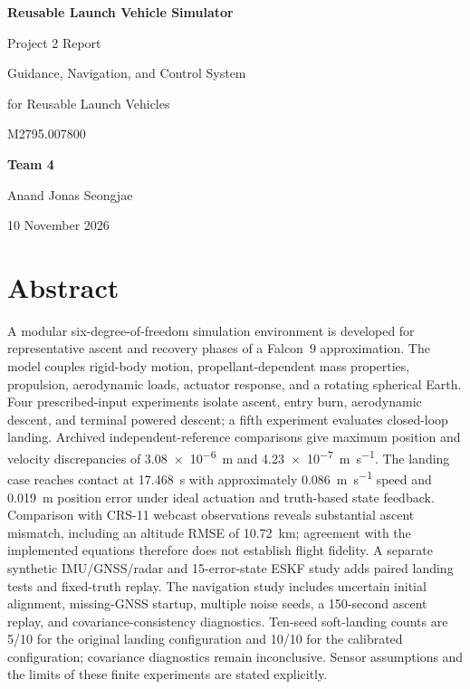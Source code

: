 \documentclass[11pt,letterpaper]{article}
\makeatletter
\newcommand{\compactcontents}{%
  \begingroup\small
  \renewcommand{\l@section}[2]{\addvspace{2pt}%
    \@dottedtocline{1}{0pt}{1.5em}{\bfseries ##1}{\bfseries ##2}}%
  \tableofcontents\endgroup}
\makeatother
\begin{document}
\hypersetup{pageanchor=false}
\begin{titlepage}
\centering
\vspace*{1.5in}
{\LARGE\bfseries Reusable Launch Vehicle Simulator\par}
\vspace{0.2in}
{\Large Project 2 Report\par}
\vspace{0.5in}
{\large Guidance, Navigation, and Control System\par
for Reusable Launch Vehicles\par}
\vspace{0.15in}
{\large M2795.007800\par}
\vfill
{\large\textbf{Team 4}\par}
\vspace{0.15in}
{\large Anand \quad Jonas \quad Seongjae\par}
\vspace{0.35in}
{\large 10 November 2026\par}
\vfill
\end{titlepage}

\hypersetup{pageanchor=true}
\section*{Abstract}
A modular six-degree-of-freedom simulation environment is developed for representative ascent and recovery phases of a Falcon~9 approximation. The model couples rigid-body motion, propellant-dependent mass properties, propulsion, aerodynamic loads, actuator response, and a rotating spherical Earth. Four prescribed-input experiments isolate ascent, entry burn, aerodynamic descent, and terminal powered descent; a fifth experiment evaluates closed-loop landing. Archived independent-reference comparisons give maximum position and velocity discrepancies of \SI{3.08e-6}{\metre} and \SI{4.23e-7}{\metre\per\second}. The landing case reaches contact at \SI{17.468}{\second} with approximately \SI{0.086}{\metre\per\second} speed and \SI{0.019}{\metre} position error under ideal actuation and truth-based state feedback. Comparison with CRS-11 webcast observations reveals substantial ascent mismatch, including an altitude RMSE of \SI{10.72}{\kilo\metre}; agreement with the implemented equations therefore does not establish flight fidelity. A separate synthetic IMU/GNSS/radar and 15-error-state ESKF study adds paired landing tests and fixed-truth replay. The navigation study includes uncertain initial alignment, missing-GNSS startup, multiple noise seeds, a 150-second ascent replay, and covariance-consistency diagnostics. Ten-seed soft-landing counts are 5/10 for the original landing configuration and 10/10 for the calibrated configuration; covariance diagnostics remain inconclusive. Sensor assumptions and the limits of these finite experiments are stated explicitly.
\clearpage
\compactcontents
\clearpage
{}
\end{document}
